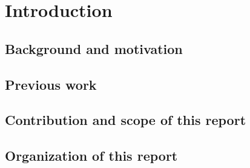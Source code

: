 \chapter{Introduction}
\section{Background and motivation}
\section{Previous work}
\section{Contribution and scope of this report}
\section{Organization of this report}
